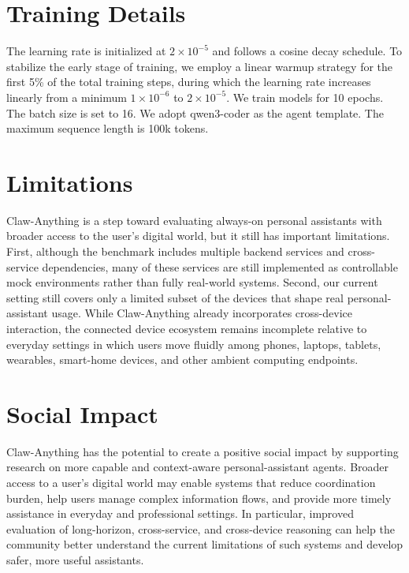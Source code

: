 \documentclass{article}
\begin{document}
\section{Training Details}

The learning rate is initialized at $2 \times 10^{-5}$ and follows a cosine decay schedule. To stabilize the early stage of training, we employ a linear warmup strategy for the first 5\% of the total training steps, during which the learning rate increases linearly from a minimum $1 \times 10^{-6}$ to $2 \times 10^{-5}$. We train models for 10 epochs. The batch size is set to 16. We adopt qwen3-coder as the agent template. The maximum sequence length is 100k tokens. 

\section{Limitations}
\label{sec:limitations}
Claw-Anything is a step toward evaluating always-on personal assistants with broader access to the user's digital world, but it still has important limitations. First, although the benchmark includes multiple backend services and cross-service dependencies, many of these services are still implemented as controllable mock environments rather than fully real-world systems. Second, our current setting still covers only a limited subset of the devices that shape real personal-assistant usage. While Claw-Anything already incorporates cross-device interaction, the connected device ecosystem remains incomplete relative to everyday settings in which users move fluidly among phones, laptops, tablets, wearables, smart-home devices, and other ambient computing endpoints.

\section{Social Impact}
\label{sec:social_impact}
Claw-Anything has the potential to create a positive social impact by supporting research on more capable and context-aware personal-assistant agents. Broader access to a user's digital world may enable systems that reduce coordination burden, help users manage complex information flows, and provide more timely assistance in everyday and professional settings. In particular, improved evaluation of long-horizon, cross-service, and cross-device reasoning can help the community better understand the current limitations of such systems and develop safer, more useful assistants.
\end{document}
